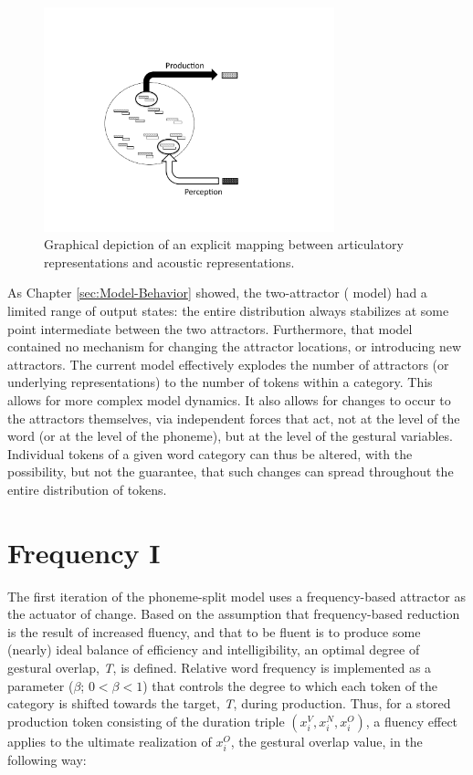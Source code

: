 \begin{figure}[H]

\includegraphics[width=0.75\textwidth]{figures/SeparateReps.pdf}\caption{\label{fig:P-toP-mapping}Graphical depiction of an explicit mapping
between articulatory representations and acoustic representations. }

\end{figure}

As Chapter \ref{sec:Model-Behavior} showed, the two-attractor (
model) had a limited range of output states: the entire distribution
always stabilizes at some point intermediate between the two attractors.
Furthermore, that model contained no mechanism for changing the attractor
locations, or introducing new attractors. The current model effectively
explodes the number of attractors (or underlying representations)
to the number of tokens within a category. This allows for more complex
model dynamics. It also allows for changes to occur to the attractors
themselves, via independent forces that act, not at the level of the
word (or at the level of the phoneme), but at the level of the gestural
variables. Individual tokens of a given word category can thus be
altered, with the possibility, but not the guarantee, that such changes
can spread throughout the entire distribution of tokens.

\section{\label{sec:Frequency-I}Frequency I}

The first iteration of the phoneme-split model uses a frequency-based
attractor as the actuator of change. Based on the assumption that
frequency-based reduction is the result of increased fluency, and
that to be fluent is to produce some (nearly) ideal balance of efficiency
and intelligibility, an optimal degree of gestural overlap, \emph{T},
is defined. Relative word frequency is implemented as a parameter
($\beta$; $0<\beta<1$) that controls the degree to which each token
of the category is shifted towards the target, \emph{T}, during production.
Thus, for a stored production token consisting of the duration triple
$(x_{i}^{V},x_{i}^{N},x_{i}^{O})$, a fluency effect applies to the
ultimate realization of $x_{i}^{O}$, the gestural overlap value,
in the following way: 


